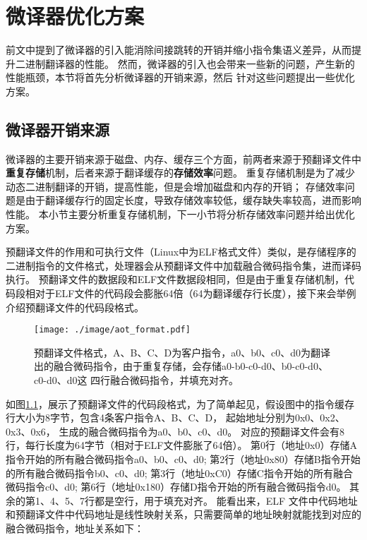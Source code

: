 \chapter{微译器优化方案}\label{chap:Opt}

前文中提到了微译器的引入能消除间接跳转的开销并缩小指令集语义差异，从而提升二进制翻译器的性能。
然而，微译器的引入也会带来一些新的问题，产生新的性能瓶颈，本节将首先分析微译器的开销来源，然后
针对这些问题提出一些优化方案。




\section{微译器开销来源}
微译器的主要开销来源于磁盘、内存、缓存三个方面，前两者来源于预翻译文件中\textbf{重复存储}机制，后者来源于翻译缓存的\textbf{存储效率}问题。
重复存储机制是为了减少动态二进制翻译的开销，提高性能，但是会增加磁盘和内存的开销；
存储效率问题是由于翻译缓存行的固定长度，导致存储效率较低，缓存缺失率较高，进而影响性能。
本小节主要分析重复存储机制，下一小节将分析存储效率问题并给出优化方案。

预翻译文件的作用和可执行文件（Linux中为ELF格式文件）类似，是存储程序的二进制指令的文件格式，处理器会从预翻译文件中加载融合微码指令集，进而译码执行。
预翻译文件的数据段和ELF文件数据段相同，但是由于重复存储机制，代码段相对于ELF文件的代码段会膨胀64倍（64为翻译缓存行长度），接下来会举例介绍预翻译文件的代码段格式。

\begin{figure}[!htbp]
  \centering
  \texttt{[image: ./image/aot\_format.pdf]}
  \caption{预翻译文件格式，A、B、C、D为客户指令，a0、b0、c0、d0为翻译出的融合微码指令，由于重复存储，会存储a0-b0-c0-d0、b0-c0-d0、c0-d0、d0这
    四行融合微码指令，并填充对齐。}
  \label{img:aot_format}
\end{figure}

如图\ref{img:aot_format}，展示了预翻译文件的代码段格式，为了简单起见，假设图中的指令缓存行大小为8字节，包含4条客户指令A、B、C、D，
起始地址分别为0x0、0x2、0x3、0x6，
生成的融合微码指令为a0、b0、c0、d0。
对应的预翻译文件会有8行，每行长度为64字节（相对于ELF文件膨胀了64倍）。
第0行（地址0x0）存储A指令开始的所有融合微码指令a0、b0、c0、d0;
第2行（地址0x80）存储B指令开始的所有融合微码指令b0、c0、d0;
第3行（地址0xC0）存储C指令开始的所有融合微码指令c0、d0;
第6行（地址0x180）存储D指令开始的所有融合微码指令d0。
其余的第1、4、5、7行都是空行，用于填充对齐。
能看出来，ELF 文件中代码地址和预翻译文件中代码地址是线性映射关系，只需要简单的地址映射就能找到对应的融合微码指令，地址关系如下：

